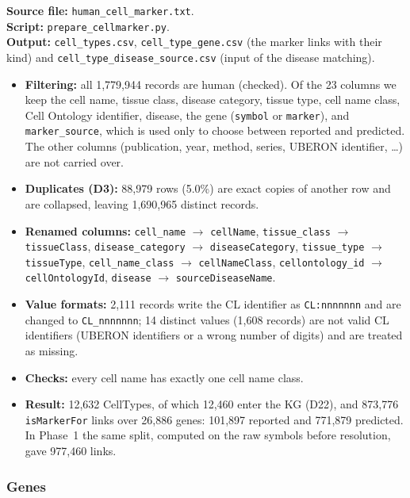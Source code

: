 {\raggedright \noindent\textbf{Source file:} \texttt{human\_cell\_marker.txt}.\\ \textbf{Script:} \texttt{prepare\_cellmarker.py}.\\ \textbf{Output:} \texttt{cell\_types.csv}, \texttt{cell\_type\_gene.csv} (the marker links with their kind) and \texttt{cell\_type\_disease\_source.csv} (input of the disease matching).\par}
\begin{itemize}
    \item \textbf{Filtering:} all 1,779,944 records are human (checked). Of the 23 columns we keep the cell name, tissue class, disease category, tissue type, cell name class, Cell Ontology identifier, disease, the gene (\texttt{symbol} or \texttt{marker}), and \texttt{marker\_source}, which is used only to choose between reported and predicted. The other columns (publication, year, method, series, UBERON identifier, \ldots) are not carried over.
    \item \textbf{Duplicates (D3):} 88,979 rows (5.0\%) are exact copies of another row and are collapsed, leaving 1,690,965 distinct records.
    \item \textbf{Renamed columns:} \texttt{cell\_name} $\rightarrow$ \texttt{cellName}, \texttt{tissue\_class} $\rightarrow$ \texttt{tissueClass}, \texttt{disease\_category} $\rightarrow$ \texttt{diseaseCategory}, \texttt{tissue\_type} $\rightarrow$ \texttt{tissueType}, \texttt{cell\_name\_class} $\rightarrow$ \texttt{cellNameClass}, \texttt{cellontology\_id} $\rightarrow$ \texttt{cellOntologyId}, \texttt{disease} $\rightarrow$ \texttt{sourceDiseaseName}.
    \item \textbf{Value formats:} 2,111 records write the CL identifier as \texttt{CL:nnnnnnn} and are changed to \texttt{CL\_nnnnnnn}; 14 distinct values (1,608 records) are not valid CL identifiers (UBERON identifiers or a wrong number of digits) and are treated as missing.
    \item \textbf{Checks:} every cell name has exactly one cell name class.
    \item \textbf{Result:} 12,632 CellTypes, of which 12,460 enter the KG (D22), and 873,776 \texttt{isMarkerFor} links over 26,886 genes: 101,897 reported and 771,879 predicted. In Phase~1 the same split, computed on the raw symbols before resolution, gave 977,460 links.
\end{itemize}

\subsubsection{Genes}


